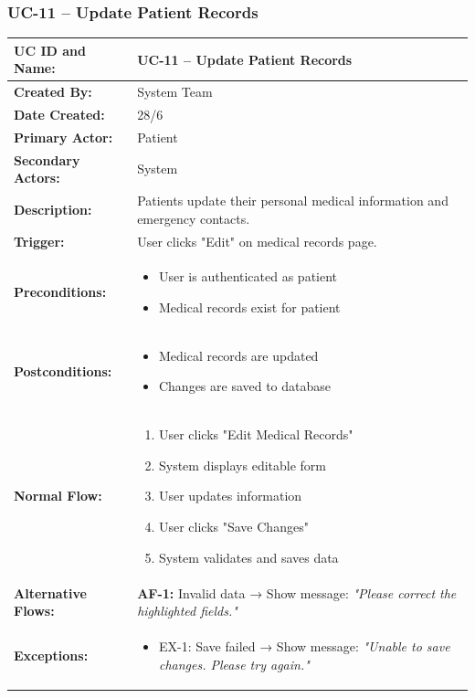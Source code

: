 \documentclass[12pt,a4paper]{article}
\begin{document}
\subsubsection{UC-11 – Update Patient Records}

\renewcommand{\arraystretch}{1.5}
\begin{longtable}{|p{4.5cm}|p{10.5cm}|}
\hline
\textbf{UC ID and Name:} & UC-11 – Update Patient Records \\
\hline
\textbf{Created By:} & System Team \\
\hline
\textbf{Date Created:} & 28/6 \\
\hline
\textbf{Primary Actor:} & Patient \\
\hline
\textbf{Secondary Actors:} & System \\
\hline
\textbf{Description:} & Patients update their personal medical information and emergency contacts. \\
\hline
\textbf{Trigger:} & User clicks "Edit" on medical records page. \\
\hline
\textbf{Preconditions:} &
\begin{itemize}
  \item User is authenticated as patient
  \item Medical records exist for patient
\end{itemize} \\
\hline
\textbf{Postconditions:} &
\begin{itemize}
  \item Medical records are updated
  \item Changes are saved to database
\end{itemize} \\
\hline
\textbf{Normal Flow:} &
\begin{enumerate}
  \item User clicks "Edit Medical Records"
  \item System displays editable form
  \item User updates information
  \item User clicks "Save Changes"
  \item System validates and saves data
\end{enumerate} \\
\hline
\textbf{Alternative Flows:} &
\textbf{AF-1:} Invalid data → Show message: \textit{"Please correct the highlighted fields."} \\
\hline
\textbf{Exceptions:} &
\begin{itemize}
  \item EX-1: Save failed → Show message: \textit{"Unable to save changes. Please try again."}

\end{itemize}
\end{longtable}
\end{document}
